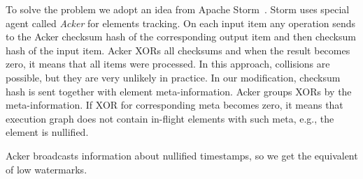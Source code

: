 To solve the problem we adopt an idea from Apache Storm~\cite{apache:storm}. Storm uses special agent called {\em Acker} for elements tracking. On each input item any operation sends to the Acker checksum hash of the corresponding output item and then checksum hash of the input item. Acker XORs all checksums and when the result becomes zero, it means that all items were processed. In this approach, collisions are possible, but they are very unlikely in practice. In our modification, checksum hash is sent together with element meta-information. Acker groups XORs by the meta-information. If XOR for corresponding meta becomes zero, it means that execution graph does not contain in-flight elements with such meta, e.g., the element is nullified. 

Acker broadcasts information about nullified timestamps, so we get the equivalent of low watermarks.





